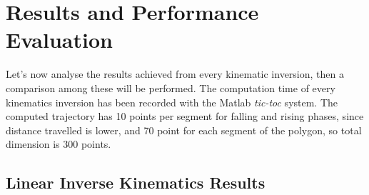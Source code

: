 \section{Results and Performance Evaluation}
\label{sec:rpe}

Let's now analyse the results achieved from every kinematic inversion, then a comparison among these will be performed. The computation time of every kinematics inversion has been recorded with the Matlab \textit{tic-toc} system. 
The computed trajectory has 10 points per segment for falling and rising phases, since distance travelled is lower, and 70 point for each segment of the polygon, so total dimension is 300 points.

\subsection{Linear Inverse Kinematics Results}

